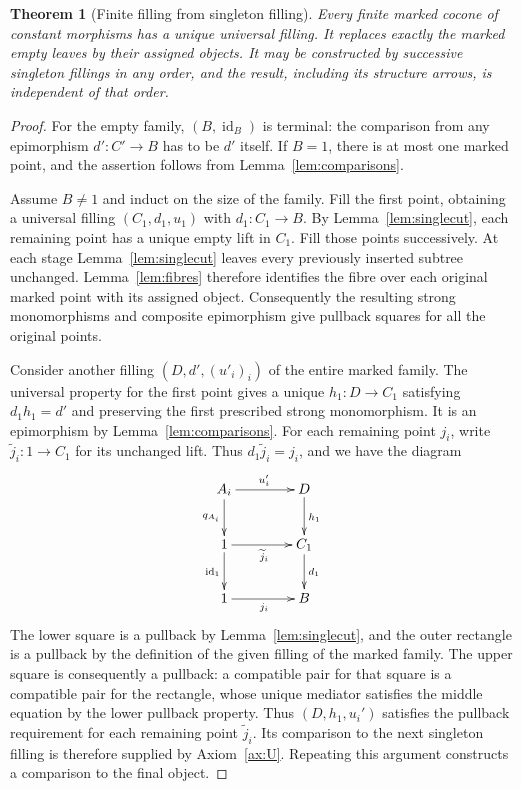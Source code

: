 \documentclass[11pt,a4paper]{article}
\theoremstyle{plain}
\newtheorem{theorem}{Theorem}[section]
\theoremstyle{definition}
\theoremstyle{remark}
\newcommand{\one}{1}
\newcommand{\id}{\operatorname{id}}
\begin{document}
\begin{theorem}[Finite filling from singleton filling]\label{thm:finite}
Every finite marked cocone of constant morphisms has a unique universal filling. It replaces exactly
the marked empty leaves by their assigned objects. It may be constructed
by successive singleton fillings in any order, and the result, including
its structure arrows, is independent of that order.
\end{theorem}
\begin{proof}
For the empty family, $(B,\id_B)$ is terminal: the comparison from
any epimorphism $d':C'\to B$ has to be $d'$ itself. If $B=\one$,
there is at most one marked point, and the assertion follows from
Lemma~\ref{lem:comparisons}.

Assume $B\ne\one$ and induct on the size of the family. Fill
the first point, obtaining a universal filling $(C_1,d_1,u_1)$
with $d_1:C_1\to B$. By Lemma~\ref{lem:singlecut}, each
remaining point has a unique empty lift in $C_1$. Fill those points
successively. At each stage Lemma~\ref{lem:singlecut} leaves every previously
inserted subtree unchanged. Lemma~\ref{lem:fibres} therefore
identifies the fibre over each original marked point with its
assigned object. Consequently the resulting strong monomorphisms
and composite epimorphism give pullback squares for all the original
points.

Consider another filling $(D,d',(u'_i)_i)$ of the entire marked
family. The universal property for the first point gives a unique
$h_1:D\to C_1$ satisfying $d_1h_1=d'$ and preserving the
first prescribed strong monomorphism. It is an epimorphism by
Lemma~\ref{lem:comparisons}. For each remaining point $j_i$,
write $\widetilde j_i:\one\to C_1$ for its unchanged lift.
Thus $d_1\widetilde j_i=j_i$, and we have the diagram
\[
 \xymatrix@C=4em@R=2.5em{
A_i\ar[r]^{u'_i}\ar[d]_{q_{A_i}}&D\ar[d]^{h_1}\\
 \one\ar[r]_{\widetilde j_i}\ar[d]_{\id_\one}
     &C_1\ar[d]^{d_1}\\
 \one\ar[r]_{j_i}&B
 }
\]
The lower square is a pullback by Lemma~\ref{lem:singlecut},
and the outer rectangle is a pullback by the definition of the
given filling of the marked family.
The upper square is consequently a pullback: a compatible pair
for that square is a compatible pair for the rectangle, whose
unique mediator satisfies the middle equation by the lower
pullback property.
Thus $(D,h_1,u_i')$ satisfies the pullback requirement for each
remaining point $\widetilde j_i$. Its comparison to the next
singleton filling is therefore supplied by Axiom~\ref{ax:U}.
Repeating this argument constructs a comparison to the final object.


\end{proof}
\end{document}
